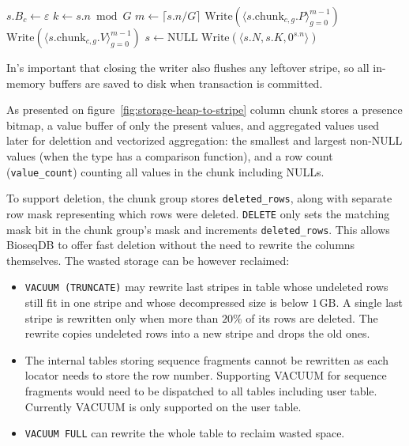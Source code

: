 \begin{algorithmic}[1]
      \State $s.B_c\gets\varepsilon$
    \EndFor
  \EndProcedure
  \Statex
    \State $k\gets s.n\bmod G$
      \State {}
    \EndIf
    \State $m\gets\lceil s.n/G\rceil$
      \State $\mathrm{Write}(\langle s.\mathrm{chunk}_{c,g}.P\rangle_{g=0}^{m-1})$
      \State $\mathrm{Write}(\langle s.\mathrm{chunk}_{c,g}.V\rangle_{g=0}^{m-1})$
    \EndFor
    \State {}
    \State $s\gets\mathrm{NULL}$
  \EndProcedure
  \Statex
    \State $\mathrm{Write}(\langle s.N, s.K, 0^{s.n} \rangle)$
  \EndProcedure
\end{algorithmic}
\endgroup

In's important that closing the writer also flushes any leftover stripe, so all in-memory buffers are saved to disk when transaction is committed.

As presented on figure~\ref{fig:storage-heap-to-stripe} column chunk stores a presence bitmap, a value buffer of only the
present values, and aggregated values used later for delettion and vectorized aggregation: the smallest
and largest non-NULL values (when the type has a comparison function), and a
row count (\texttt{value\_count}) counting all values in the chunk including NULLs.

To support deletion, the chunk group stores \texttt{deleted\_rows}, along with separate row mask representing which rows were deleted.
\texttt{DELETE} only sets the matching mask bit in the chunk group's mask and increments \texttt{deleted\_rows}. This allows BioseqDB to offer fast deletion without the need 
to rewrite the columns themselves. The wasted storage can be however reclaimed:
\begin{itemize}
  \item \texttt{VACUUM (TRUNCATE)} may rewrite last stripes in table whose undeleted rows still fit in
    one stripe and whose decompressed size is below $1\,\mathrm{GB}$. A single
    last stripe is rewritten only when more than $20\%$ of its rows are
    deleted. The rewrite copies undeleted rows into a new stripe and drops the old ones.
  \item The internal tables storing sequence fragments cannot be rewritten as each locator needs to store the row number. Supporting VACUUM for sequence fragments would need to be dispatched to all tables including user table. Currently VACUUM is only supported on the user table.
  \item \texttt{VACUUM FULL} can rewrite the whole table to reclaim wasted space.
\end{itemize}

